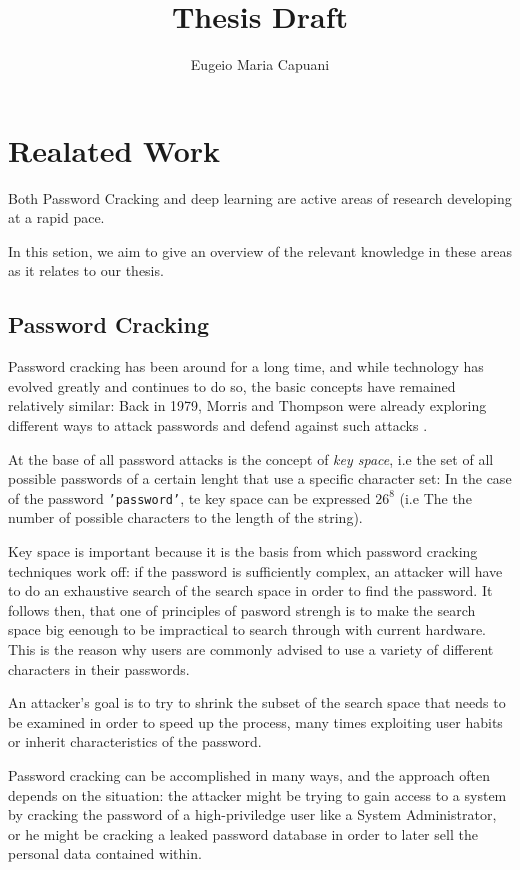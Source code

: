 \documentclass[a4paper,11pt]{article}
\begin{document}
\pagestyle{empty}
\title{Thesis Draft}
\author{Eugeio Maria Capuani}
\maketitle
\cleardoublepage
\section{Realated Work}
Both Password Cracking and deep learning are active areas of research developing at a rapid pace.

In this setion, we aim to give an overview of the relevant knowledge in these areas as it relates to our thesis.

\subsection{Password Cracking}
Password cracking has been around for a long time, and while technology has evolved greatly and continues to do so, the basic concepts have remained relatively similar:
Back in 1979, Morris and Thompson were already exploring different ways to attack passwords and defend against such attacks \cite{Thompson1979}.

At the base of all password attacks is the concept of \emph{key space}, i.e the set of all possible passwords of a certain lenght that use a specific character set: In the case of the password \texttt{'password'}, te key space can be expressed $26^8$ (i.e The the number of possible characters to the length of the string).

Key space is important because it is the basis from which password cracking techniques work off: if the password is sufficiently complex, an attacker will have to do an exhaustive search of the search space in order to find the password. It follows then, that one of principles of pasword strengh is to make the search space big eenough to be impractical to search through with current hardware.
This is the reason why users are commonly advised to use a variety of different characters in their passwords.

An attacker's goal is to try to shrink the subset of the search space that needs to be examined in order to speed up the process, many times exploiting user habits or inherit characteristics of the password.

Password cracking can be accomplished in many ways, and the approach often depends on the situation: the attacker might be trying to gain access to a system by cracking the password of a high-priviledge user like a System Administrator, or he might be cracking a leaked password database in order to later sell the personal data contained within.
\end{document}
